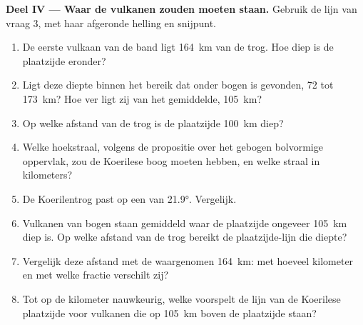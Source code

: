 \begin{problem}
\medskip
\noindent\textbf{Deel IV --- Waar de vulkanen zouden moeten staan.} Gebruik de lijn van vraag 3, met haar afgeronde helling en snijpunt.
\begin{enumerate}[resume]
  \item De eerste vulkaan van de band ligt \qty{164}{km} van de trog. Hoe diep is de plaatzijde eronder?
  \item Ligt deze diepte binnen het bereik dat onder bogen is gevonden, 72 tot \qty{173}{km}? Hoe ver ligt zij van het gemiddelde, \qty{105}{km}?
  \item Op welke afstand van de trog is de plaatzijde \qty{100}{km} diep?
  \item Welke hoekstraal, volgens de propositie over het gebogen bolvormige oppervlak, zou de Koerilese boog moeten hebben, en welke straal in kilometers?
  \item De Koerilentrog past op een  van \ang{21.9}. Vergelijk.
  \item Vulkanen van bogen staan gemiddeld waar de plaatzijde ongeveer \qty{105}{km} diep is. Op welke afstand van de trog bereikt de plaatzijde-lijn die diepte?
  \item Vergelijk deze afstand met de waargenomen \qty{164}{km}: met hoeveel kilometer en met welke fractie verschilt zij?
  \item Tot op de kilometer nauwkeurig, welke  voorspelt de lijn van de Koerilese plaatzijde voor vulkanen die op \qty{105}{km} boven de plaatzijde staan?
\end{enumerate}
\end{problem}
